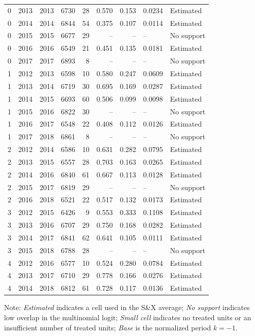 \begin{longtable}{rrrrrrrll}
0 & 2013 & 2013 & 6730 & 28 & 0.570 & 0.153 & 0.0234 & Estimated \\
0 & 2014 & 2014 & 6844 & 54 & 0.375 & 0.107 & 0.0114 & Estimated \\
0 & 2015 & 2015 & 6677 & 29 & -- & -- & -- & No support \\
0 & 2016 & 2016 & 6549 & 21 & 0.451 & 0.135 & 0.0181 & Estimated \\
0 & 2017 & 2017 & 6893 & 8 & -- & -- & -- & No support \\
1 & 2012 & 2013 & 6598 & 10 & 0.580 & 0.247 & 0.0609 & Estimated \\
1 & 2013 & 2014 & 6719 & 30 & 0.695 & 0.169 & 0.0287 & Estimated \\
1 & 2014 & 2015 & 6693 & 60 & 0.506 & 0.099 & 0.0098 & Estimated \\
1 & 2015 & 2016 & 6822 & 30 & -- & -- & -- & No support \\
1 & 2016 & 2017 & 6548 & 22 & 0.408 & 0.112 & 0.0126 & Estimated \\
1 & 2017 & 2018 & 6861 & 8 & -- & -- & -- & No support \\
2 & 2012 & 2014 & 6586 & 10 & 0.631 & 0.282 & 0.0795 & Estimated \\
2 & 2013 & 2015 & 6557 & 28 & 0.703 & 0.163 & 0.0265 & Estimated \\
2 & 2014 & 2016 & 6840 & 61 & 0.667 & 0.113 & 0.0128 & Estimated \\
2 & 2015 & 2017 & 6819 & 29 & -- & -- & -- & No support \\
2 & 2016 & 2018 & 6521 & 22 & 0.517 & 0.132 & 0.0173 & Estimated \\
3 & 2012 & 2015 & 6426 & 9 & 0.553 & 0.333 & 0.1108 & Estimated \\
3 & 2013 & 2016 & 6707 & 29 & 0.750 & 0.168 & 0.0282 & Estimated \\
3 & 2014 & 2017 & 6841 & 62 & 0.641 & 0.105 & 0.0111 & Estimated \\
3 & 2015 & 2018 & 6788 & 28 & -- & -- & -- & No support \\
4 & 2012 & 2016 & 6577 & 10 & 0.524 & 0.280 & 0.0784 & Estimated \\
4 & 2013 & 2017 & 6710 & 29 & 0.778 & 0.166 & 0.0276 & Estimated \\
4 & 2014 & 2018 & 6812 & 61 & 0.728 & 0.117 & 0.0136 & Estimated \\
\end{longtable}
\vspace{-0.35cm}
\noindent\footnotesize Note: \textit{Estimated} indicates a cell used in the S\&X average; \textit{No support} indicates low overlap in the multinomial logit; \textit{Small cell} indicates no treated units or an insufficient number of treated units; \textit{Base} is the normalized period \(k=-1\).
\par\endgroup



